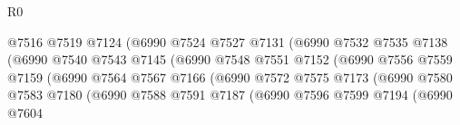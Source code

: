 \begin{lexlean}{R0}
\begin{coremodule}
                                          @7516
                                          @7519
                                          @7124
                                          (@6990
                                            @7524
                                            @7527
                                            @7131
                                            (@6990
                                              @7532
                                              @7535
                                              @7138
                                              (@6990
                                                @7540
                                                @7543
                                                @7145
                                                (@6990
                                                  @7548
                                                  @7551
                                                  @7152
                                                  (@6990
                                                    @7556
                                                    @7559
                                                    @7159
                                                    (@6990
                                                      @7564
                                                      @7567
                                                      @7166
                                                      (@6990
                                                        @7572
                                                        @7575
                                                        @7173
                                                        (@6990
                                                          @7580
                                                          @7583
                                                          @7180
                                                          (@6990
                                                            @7588
                                                            @7591
                                                            @7187
                                                            (@6990
                                                              @7596
                                                              @7599
                                                              @7194
                                                              (@6990
                                                                @7604

\end{coremodule}
\end{lexlean}
